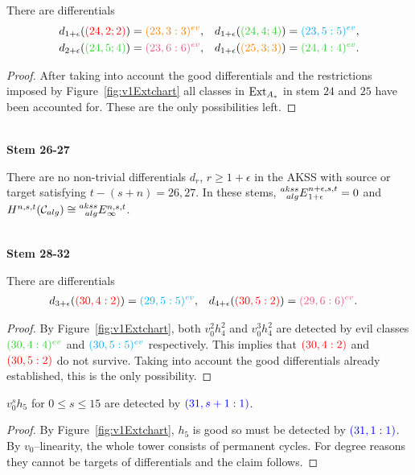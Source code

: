 \begin{prop}
There are differentials
\begin{align*}
d_{1+\epsilon}( {\color{red}(24,2;2)})&={\color{orange}(23,3:3)^{ev}}, & d_{1+\epsilon}( {\color{limegreen}(24,4;4)})&={\color{cyan}(23,5:5)^{ev}}, \\
d_{2+\epsilon}({\color{limegreen}(24,5;4)} )&={\color{lavenderrose}(23,6:6)^{ev}}, &
d_{1+\epsilon}( {\color{orange}(25,3;3)})&={\color{limegreen}(24,4:4)^{ev}}.
\end{align*}
\end{prop}
\begin{proof}
After taking into account the good differentials and the restrictions imposed by Figure~\ref{fig:v1Extchart} all classes in $\operatorname{Ext}_{A_*}$ in stem $24$ and $25$ have been accounted for. These are the only possibilities left.
\end{proof}



\ \\
\noindent
{\bf Stem 26-27}

\begin{prop}
There are no non-trivial differentials $d_r$, $r \geq 1+\epsilon$ in the AKSS with source or target satisfying $t-(s+n) =26, 27$. In these stems, $\prescript{akss}{alg}{E}^{n+\epsilon,s,t}_{1+\epsilon} =0$ and
$H^{n,s,t}(\mathcal{C}_{alg}) \cong   \prescript{akss}{alg}{E}^{n,s,t}_{\infty} $.
\end{prop}


\ \\
\noindent
{\bf Stem 28-32}


\begin{prop}
There are differentials
\begin{align*}
d_{3+\epsilon}({\color{red}(30,4:2)}) &= {\color{cyan}(29,5:5)^{ev}} , &
d_{4+\epsilon}({\color{red}(30,5:2)}) &= {\color{lavenderrose}(29,6:6)^{ev}}.\end{align*}
\end{prop}
\begin{proof}
By Figure~\ref{fig:v1Extchart}, both $v_0^2h_4^2$ and $v_0^3h_4^2$ are detected by evil classes ${\color{limegreen}(30,4:4)^{ev}}$ and ${\color{cyan}(30,5:5)^{ev}}$ respectively. This implies that ${\color{red}(30,4:2)}$ and ${\color{red}(30,5:2)}$ do not survive. Taking into account the good differentials already established, this is the only possibility.
\end{proof}

\begin{prop}
$v_0^sh_5$ for $0\leq s \leq 15$ are detected by ${\color{blue}(31, s+1 : 1)}$.
\end{prop}
\begin{proof}
By Figure~\ref{fig:v1Extchart}, $h_5$ is good so must be detected by ${\color{blue}(31, 1 : 1)}$. By $v_0$--linearity, the whole tower consists of permanent cycles. For  degree reasons they cannot be targets of differentials and the claim follows.
\end{proof}

